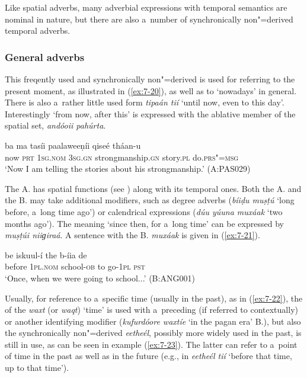 Like spatial adverbs, many adverbial expressions with temporal semantics are nominal in nature, but there are also a~number of synchronically non"=derived temporal adverbs.

\subsubsection*{General  adverbs}

 This freqently used and synchronically non"=derived  is
used for referring to the present moment, as illustrated in (\ref{ex:7-20}), as well as to
`nowadays' in general. There is also a~rather little used form \textit{tipaán tií} `until
now, even to this day'. Interestingly `from now, after this' is expressed with the 
ablative member of the spatial set, \textit{andóoii pahúrta}.

\begin{exe}
\ex
\label{ex:7-20}
\gll [típa] ba ma tasíi paalaweeṇíi qiseé tháan-u \\
now \textsc{prt} \textsc{1sg.nom} \textsc{3sg.gn} strongmanship.\textsc{gn} story.\textsc{pl} do.\textsc{prs"=msg}\\
\glt `Now I am telling the stories about his strongmanship.' (A:PAS029)
\end{exe}

 The A.  has spatial functions (see ) along with its temporal ones. Both the A. and the B.  may take additional modifiers, such as degree adverbs (\textit{bíiḍu muṣṭú} `long before, a~long time ago') or calendrical expressions (\textit{dúu yúuna muxáak} `two months ago'). The meaning `since then, for a~long time' can be expressed by \textit{muṣṭúi niiɡiraá}. A sentence with the B.  \textit{muxáak} is given in (\ref{ex:7-21}).

\begin{exe}
\ex
\label{ex:7-21}
\gll [muxáak] be iskuul-í the b-íia de \\
before  \textsc{1pl.nom} school-\textsc{ob} to go-\textsc{1pl} \textsc{pst}\\
\glt `Once, when we were going to school...' (B:ANG001)
\end{exe}

 Usually, for reference to a~specific time (usually in the past), as in (\ref{ex:7-22}), the  of the  \textit{waxt} (or \textit{waqt}) `time' is used with a~preceding  (if referred to contextually) or another identifying modifier (\textit{kufurdóore waxtíe} `in the pagan era' B.), but also the synchronically non"=derived  \textit{eetheél}, possibly more widely used in the past, is still in use, as can be seen in example (\ref{ex:7-23}). The latter can refer to a~point of time in the past as well as in the future (e.g., in \textit{eetheél tií} `before that time, up to that time').

